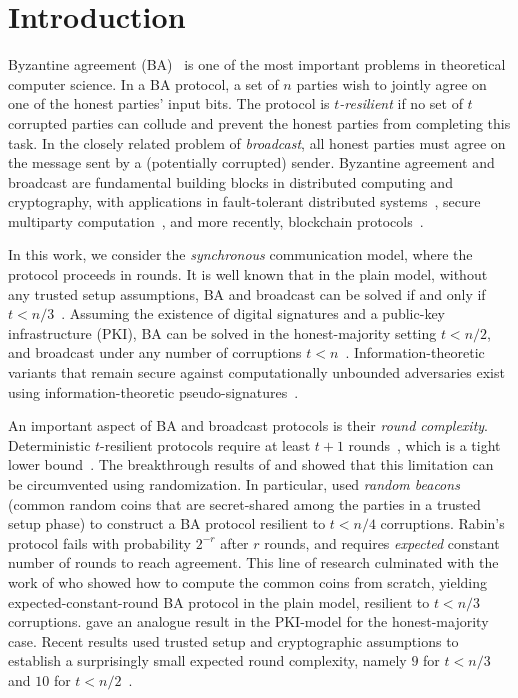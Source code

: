 \section{Introduction}\label{sec:intro}

Byzantine agreement (BA)~\cite{PSL80,LSP82} is one of the most important problems in theoretical computer science. In a BA protocol, a set of $n$ parties wish to jointly agree on one of the honest parties' input bits.
The protocol is \emph{$t$-resilient} if no set of $t$ corrupted parties can collude and prevent the honest parties from completing this task.
In the closely related problem of \emph{broadcast}, all honest parties must agree on the message sent by a (potentially corrupted) sender.
Byzantine agreement and broadcast are fundamental building blocks in distributed computing and cryptography, with applications in fault-tolerant distributed systems~\cite{CL99,KBCCEGGRWWWZ00}, secure multiparty computation~\cite{Yao82,GMW87,BGW88,CCD88}, and more recently, blockchain protocols~\cite{SM16,GHMVZ17,PS18}.

In this work, we consider the \emph{synchronous} communication model, where the protocol proceeds in rounds. It is well known that in the plain model, without any trusted setup assumptions, BA and broadcast can be solved if and only if $t<n/3$~\cite{PSL80,LSP82,FLM85,GM93}. Assuming the existence of digital signatures and a public-key infrastructure (PKI), BA can be solved in the honest-majority setting $t<n/2$, and broadcast under any number of corruptions $t<n$~\cite{DS83}. Information-theoretic variants that remain secure against computationally unbounded adversaries exist using information-theoretic pseudo-signatures~\cite{PW92}.

An important aspect of BA and broadcast protocols is their \emph{round complexity}. Deterministic $t$-resilient protocols require at least $t+1$ rounds~\cite{FL82,DS83}, which is a tight lower bound~\cite{DS83,GM93}. The breakthrough results of \citet{Ben-Or83} and \citet{Rabin83} showed that this limitation can be circumvented using randomization. In particular, \citet{Rabin83} used \emph{random beacons} (common random coins that are secret-shared among the parties in a trusted setup phase) to construct a BA protocol resilient to $t<n/4$ corruptions. Rabin's protocol fails with probability $2^{-r}$ after $r$ rounds, and requires \emph{expected} constant number of rounds to reach agreement. This line of research culminated with the work of \citet{FM97} who showed how to compute the common coins from scratch, yielding expected-constant-round BA protocol in the plain model, resilient to $t<n/3$ corruptions. \citet{KK06} gave an analogue result in the PKI-model for the honest-majority case. Recent results used trusted setup and cryptographic assumptions to establish a surprisingly small expected round complexity, namely $9$ for $t<n/3$~\cite{Micali17} and $10$ for $t<n/2$~\cite{MV17,ADDNR19}.

